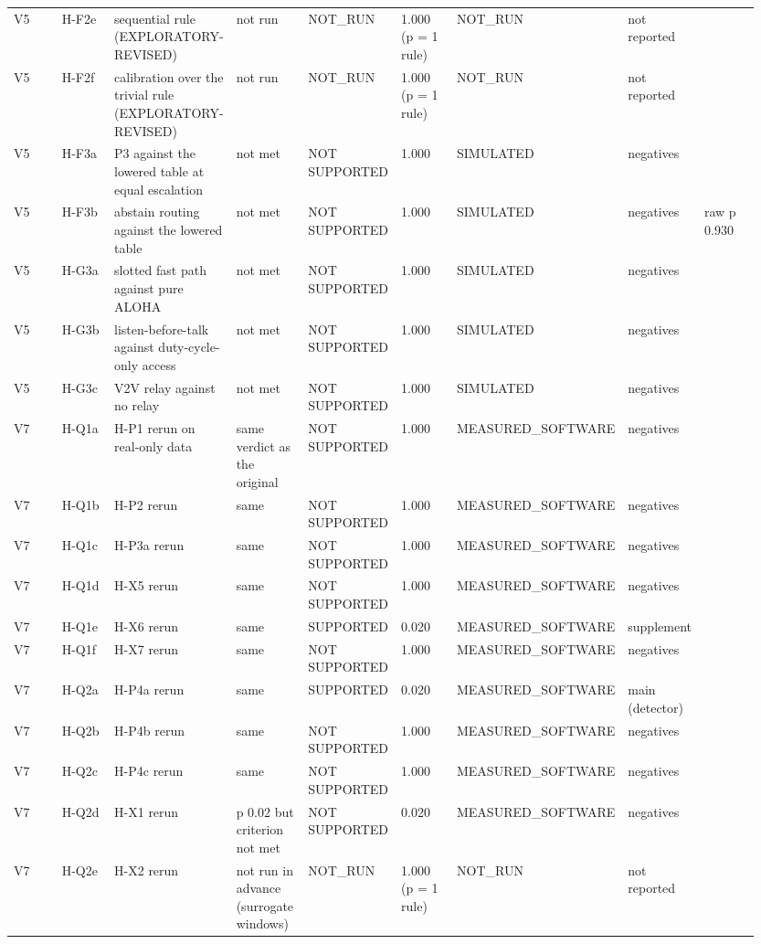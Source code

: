 {\begin{longtable}{p{0.106\linewidth}p{0.106\linewidth}p{0.106\linewidth}p{0.106\linewidth}p{0.106\linewidth}p{0.106\linewidth}p{0.106\linewidth}p{0.106\linewidth}p{0.106\linewidth}}
V5 & H-F2e & sequential rule (EXPLORATORY-REVISED) & not run & NOT\_RUN & 1.000 (p = 1 rule) & NOT\_RUN & not reported &  \\
V5 & H-F2f & calibration over the trivial rule (EXPLORATORY-REVISED) & not run & NOT\_RUN & 1.000 (p = 1 rule) & NOT\_RUN & not reported &  \\
V5 & H-F3a & P3 against the lowered table at equal escalation & not met & NOT SUPPORTED & 1.000 & SIMULATED & negatives &  \\
V5 & H-F3b & abstain routing against the lowered table & not met & NOT SUPPORTED & 1.000 & SIMULATED & negatives & raw p 0.930 \\
V5 & H-G3a & slotted fast path against pure ALOHA & not met & NOT SUPPORTED & 1.000 & SIMULATED & negatives &  \\
V5 & H-G3b & listen-before-talk against duty-cycle-only access & not met & NOT SUPPORTED & 1.000 & SIMULATED & negatives &  \\
V5 & H-G3c & V2V relay against no relay & not met & NOT SUPPORTED & 1.000 & SIMULATED & negatives &  \\
V7 & H-Q1a & H-P1 rerun on real-only data & same verdict as the original & NOT SUPPORTED & 1.000 & MEASURED\_SOFTWARE & negatives &  \\
V7 & H-Q1b & H-P2 rerun & same & NOT SUPPORTED & 1.000 & MEASURED\_SOFTWARE & negatives &  \\
V7 & H-Q1c & H-P3a rerun & same & NOT SUPPORTED & 1.000 & MEASURED\_SOFTWARE & negatives &  \\
V7 & H-Q1d & H-X5 rerun & same & NOT SUPPORTED & 1.000 & MEASURED\_SOFTWARE & negatives &  \\
V7 & H-Q1e & H-X6 rerun & same & SUPPORTED & 0.020 & MEASURED\_SOFTWARE & supplement &  \\
V7 & H-Q1f & H-X7 rerun & same & NOT SUPPORTED & 1.000 & MEASURED\_SOFTWARE & negatives &  \\
V7 & H-Q2a & H-P4a rerun & same & SUPPORTED & 0.020 & MEASURED\_SOFTWARE & main (detector) &  \\
V7 & H-Q2b & H-P4b rerun & same & NOT SUPPORTED & 1.000 & MEASURED\_SOFTWARE & negatives &  \\
V7 & H-Q2c & H-P4c rerun & same & NOT SUPPORTED & 1.000 & MEASURED\_SOFTWARE & negatives &  \\
V7 & H-Q2d & H-X1 rerun & p 0.02 but criterion not met & NOT SUPPORTED & 0.020 & MEASURED\_SOFTWARE & negatives &  \\
V7 & H-Q2e & H-X2 rerun & not run in advance (surrogate windows) & NOT\_RUN & 1.000 (p = 1 rule) & NOT\_RUN & not reported &  \\

\end{longtable}}
